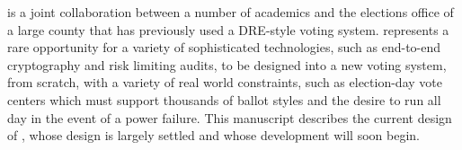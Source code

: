 \projname is a joint collaboration between a number of academics and
the elections office of a large county that has previously used a DRE-style
voting system. \projname represents a rare opportunity for a variety of
sophisticated technologies, such as end-to-end cryptography and risk limiting
audits, to be designed into a new voting system, from scratch, with
a variety of real world constraints, such as election-day vote centers
which must support thousands of ballot styles and the desire to run
all day in the event of a power failure. This manuscript describes the
current design of \projname, whose design is largely settled and whose
development will soon begin.

